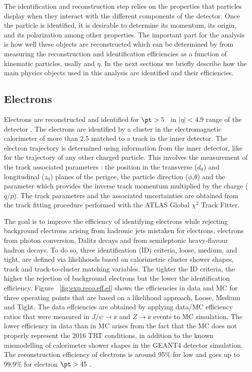 The identification and reconstruction step relies on the properties that particles display when they interact with the different components of the detector.
Once the particle is identified, it is desirable to determine its momentum, its origin, and its polarization among other properties.
The important part for the analysis is how well these objects are reconstructed which can be determined by from measuring the reconstruction and 
identification efficiencies as a function of kinematic particles, usally \pt and $\eta$.
In the next sections we briefly describe how the main physics objects used in this analysis are identified and their efficiencies.

\subsection{Electrons}
Electrons are reconstructed and identified for $\pt > 5$ \GeV~in $|\eta| < 4.9$ range of the detector \cite{ATLAS-CONF-2016-024}.
The electrons  are identified by a cluster in the electromagnetic calorimeter of more than 2.5 \GeV matched to a track in the inner detector.
The electron trajectory is determined using information from the inner detector, like for the trajectory
of any other charged particle. This involves the measurement of the track associated parameters : the
position in the transverse ($d_0$) and longitudinal ($z_0$) planes of the perigee, the particle direction ($\phi$,$\theta$)
and the parameter which provides the inverse track momentum multiplied by the charge ($q/p$). The track
parameters and the associated uncertainties are obtained from the track fitting procedure performed with
the ATLAS Global $\chi^2$ Track Fitter.

The goal is to improve the efficiency of identifying electrons while rejecting background electrons arising from hadronic jets mistaken for electrons, 
electrons from photon conversion, Dalitz decays and from semileptonic heavy-flavour hadron decays.
To do so, three identification (ID) criteria, loose, medium, and tight, are defined via likelihoods based on calorimetric cluster shower shapes, 
track and track-to-cluster matching variables.
The tighter the ID criteria, the higher the rejection of background electrons but the lower the identification efficiency.
Figure ~\ref{fig:exp.reco.eff.el} shows the  efficiencies in data and MC for three operating points that are based on a likelihood approach, Loose, Medium and Tight. 
The data effciencies are obtained by applying data/MC efficiency ratios that were measured in  $J/\psi\to\ee$ and $Z\to\ee$ events to MC simulation. 
The lower efficiency in data than in MC arises from the fact that the MC does not properly represent the 2016 TRT conditions, 
in addition to the known mismodelling of calorimeter shower shapes in the GEANT4 detector simulation.
The reconstruction efficiency of electrons is around 95\% for low \pt and goes up to 99.9\% for electron $\pt > 45$ \GeV.


